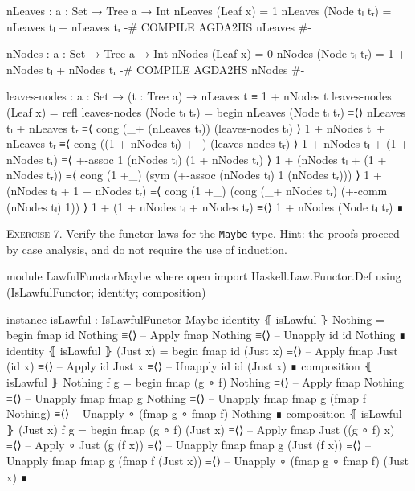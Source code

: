 \documentclass{article}
\begin{document}
\begin{code}
nLeaves : {a : Set} → Tree a → Int
nLeaves (Leaf x) = 1
nLeaves (Node tₗ tᵣ) = nLeaves tₗ + nLeaves tᵣ
{-# COMPILE AGDA2HS nLeaves #-}

nNodes : {a : Set} → Tree a → Int
nNodes (Leaf x) = 0
nNodes (Node tₗ tᵣ) = 1 + nNodes tₗ + nNodes tᵣ
{-# COMPILE AGDA2HS nNodes #-}

leaves-nodes : {a : Set} → (t : Tree a)
    → nLeaves t ≡ 1 + nNodes t
leaves-nodes (Leaf x) = refl
leaves-nodes (Node tₗ tᵣ) =
  begin
    nLeaves (Node tₗ tᵣ)
  ≡⟨⟩
    nLeaves tₗ + nLeaves tᵣ
  ≡⟨ cong (_+ (nLeaves tᵣ)) (leaves-nodes tₗ) ⟩
    1 + nNodes tₗ + nLeaves tᵣ
  ≡⟨ cong ((1 + nNodes tₗ) +_) (leaves-nodes tᵣ) ⟩
    1 + nNodes tₗ + (1 + nNodes tᵣ)
  ≡⟨ +-assoc 1 (nNodes tₗ) (1 + nNodes tᵣ) ⟩
    1 + (nNodes tₗ + (1 + nNodes tᵣ))
  ≡⟨ cong (1 +_) (sym (+-assoc (nNodes tₗ) 1 (nNodes tᵣ))) ⟩
    1 + (nNodes tₗ + 1 + nNodes tᵣ)
  ≡⟨ cong (1 +_) (cong (_+ nNodes tᵣ) (+-comm (nNodes tₗ) 1)) ⟩
    1 + (1 + nNodes tₗ + nNodes tᵣ)
  ≡⟨⟩
    1 + nNodes (Node tₗ tᵣ)
  ∎
\end{code}

\noindent
\textsc{Exercise 7.} Verify the functor laws for the \texttt{Maybe} type. Hint: the proofs proceed by case analysis, and do not require the use of induction.

\begin{code}
module LawfulFunctorMaybe where
  open import Haskell.Law.Functor.Def
    using (IsLawfulFunctor; identity; composition)

  instance
    isLawful : IsLawfulFunctor Maybe
    identity ⦃ isLawful ⦄ Nothing =
      begin
        fmap id Nothing
      ≡⟨⟩ -- Apply fmap
        Nothing
      ≡⟨⟩ -- Unapply id
        id Nothing
      ∎
    identity ⦃ isLawful ⦄ (Just x) =
      begin
        fmap id (Just x)
      ≡⟨⟩ -- Apply fmap
        Just (id x)
      ≡⟨⟩ -- Apply id
        Just x
      ≡⟨⟩ -- Unapply id
        id (Just x)
      ∎
    composition ⦃ isLawful ⦄ Nothing f g =
      begin
        fmap (g ∘ f) Nothing
      ≡⟨⟩ -- Apply fmap
        Nothing
      ≡⟨⟩ -- Unapply fmap
        fmap g Nothing
      ≡⟨⟩ -- Unapply fmap
        fmap g (fmap f Nothing)
      ≡⟨⟩ -- Unapply ∘
        (fmap g ∘ fmap f) Nothing
      ∎
    composition ⦃ isLawful ⦄ (Just x) f g =
      begin
        fmap (g ∘ f) (Just x)
      ≡⟨⟩ -- Apply fmap
        Just ((g ∘ f) x)
      ≡⟨⟩ -- Apply ∘
        Just (g (f x))
      ≡⟨⟩ -- Unapply fmap
        fmap g (Just (f x))
      ≡⟨⟩ -- Unapply fmap
        fmap g (fmap f (Just x))
      ≡⟨⟩ -- Unapply ∘
        (fmap g ∘ fmap f) (Just x)
      ∎
\end{code}
\end{document}
